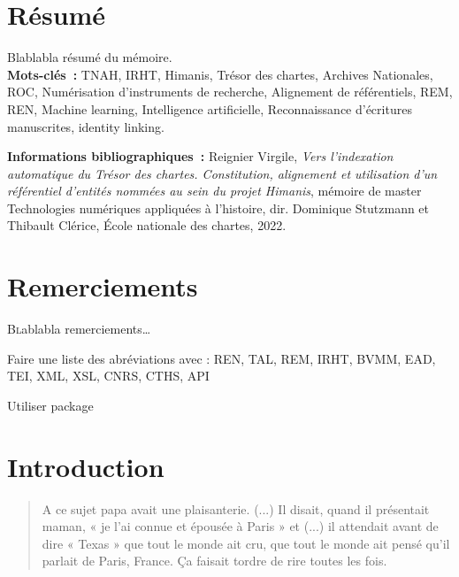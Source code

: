 \documentclass[a4paper,12pt,twoside]{book}
\begin{document}
	\chapter{Résumé}
	\medskip
	Blablabla résumé du mémoire.\\
	
	\textbf{Mots-clés~:} TNAH, IRHT, Himanis, Trésor des chartes, Archives Nationales, ROC, Numérisation d'instruments de recherche, Alignement de référentiels, REM, REN, Machine learning, Intelligence artificielle, Reconnaissance d'écritures manuscrites, identity linking.
	
	\textbf{Informations bibliographiques~:} Reignier Virgile, \textit{Vers l’indexation automatique du Trésor des chartes. Constitution, alignement et utilisation d'un référentiel d’entités nommées au sein du projet Himanis}, mémoire de master \og{}Technologies numériques appliquées à l'histoire\fg{}, dir. Dominique Stutzmann et Thibault Clérice, École nationale des chartes, 2022.
	
	\chapter{Remerciements}
	
	\lettrine{B}lablabla remerciements\dots
	
		Faire une liste des abréviations avec : REN, TAL, REM, IRHT, BVMM, EAD, TEI, XML, XSL, CNRS, CTHS, API
		
		Utiliser package %
	
	\printbibliography
	
	\chapter{Introduction}
	
	\begin{quotation}
		
	A ce sujet papa avait une plaisanterie. (...) Il disait, quand il présentait maman, « je l’ai connue et épousée à Paris » et (...) il attendait avant de dire « Texas » que tout le monde ait cru, que tout le monde ait pensé qu’il parlait de Paris, France. Ça faisait tordre de rire toutes les fois.
	
	\end{quotation}
	\bigbreak
	
\end{document}
